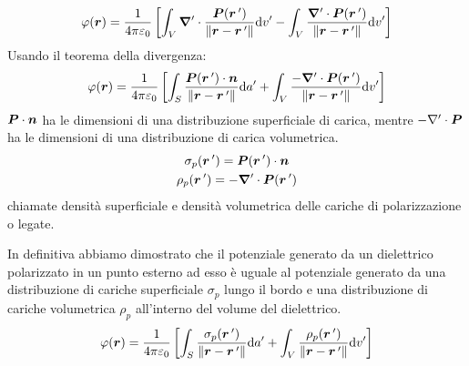 \begin{equation}
  \varphi(\boldsymbol{r})=\frac{1}{4\pi\varepsilon_0}\left[\int_V\boldsymbol{\nabla}'\cdot\frac{\boldsymbol{P}(\boldsymbol{r}\,')}{\left\lVert\boldsymbol{r}-\boldsymbol{r}\,'\right\rVert}\mathrm{d} v'-\int_V\frac{\boldsymbol{\nabla}'\cdot\boldsymbol{P}(\boldsymbol{r}\,')}{\left\lVert\boldsymbol{r}-\boldsymbol{r}\,'\right\rVert}\mathrm{d} v'\right]
\end{equation}
Usando il teorema della divergenza:
\begin{equation}
  \varphi(\boldsymbol{r})=\frac{1}{4\pi\varepsilon_0}\left[\int_S\frac{\boldsymbol{P}(\boldsymbol{r}\,')\cdot \boldsymbol{n}}{\left\lVert\boldsymbol{r}-\boldsymbol{r}\,'\right\rVert}\mathrm{d} a'+\int_V\frac{-\boldsymbol{\nabla}'\cdot\boldsymbol{P}(\boldsymbol{r}\,')}{\left\lVert\boldsymbol{r}-\boldsymbol{r}\,'\right\rVert}\mathrm{d} v'\right]
\end{equation}
$\boldsymbol{P}\cdot\boldsymbol{n}$ ha le dimensioni di una distribuzione superficiale di carica, mentre $-\nabla'\cdot\boldsymbol{P}$ ha le dimensioni di una distribuzione di carica volumetrica.
\begin{subequations}
  \begin{gather}
    \sigma_p(\boldsymbol{r}\,')=\boldsymbol{P}(\boldsymbol{r}\,')\cdot \boldsymbol{n}\\
    \rho_p(\boldsymbol{r}\,')=-\boldsymbol{\nabla}'\cdot\boldsymbol{P}(\boldsymbol{r}\,')
  \end{gather}
\end{subequations}
chiamate densità superficiale e densità volumetrica delle cariche di polarizzazione o legate.

In definitiva abbiamo dimostrato che il potenziale generato da un dielettrico polarizzato in un punto esterno ad esso è uguale al potenziale generato da una distribuzione di cariche superficiale $\sigma_p$ lungo il bordo e una distribuzione di cariche volumetrica $\rho_p$ all'interno del volume del dielettrico.
\begin{equation}
  \varphi(\boldsymbol{r})=\frac{1}{4\pi\varepsilon_0}\left[\int_S\frac{\sigma_p(\boldsymbol{r}\,')}{\left\lVert\boldsymbol{r}-\boldsymbol{r}\,'\right\rVert}\mathrm{d} a'+\int_V\frac{\rho_p(\boldsymbol{r}\,')}{\left\lVert\boldsymbol{r}-\boldsymbol{r}\,'\right\rVert}\mathrm{d} v'\right]
  \label{potenziale_dielettrico_esterno9}
\end{equation}

